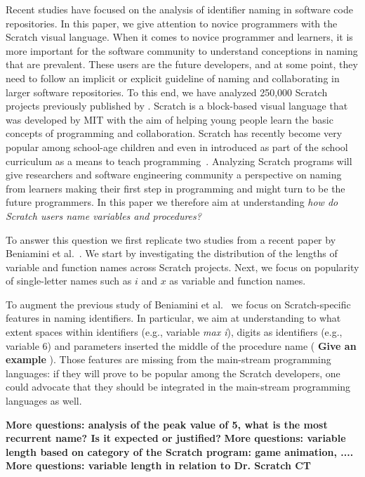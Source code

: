 \documentclass[conference]{IEEEtran}
\newcommand{\todo}[1]{ \textbf{#1} }
\begin{document}
Recent studies have focused on the analysis of identifier naming in software code repositories. 
In this paper, we give attention to novice programmers with the Scratch visual language. 
When it comes to novice programmer and learners, it is more important for the software community to understand conceptions in naming that are prevalent. 
These users are the future developers, and at some point, they need to follow an implicit or explicit guideline of naming and collaborating in larger software repositories. 
To this end, we have analyzed 250,000 Scratch projects previously published by \cite{Aivaloglou2016HowKC}.
Scratch is a block-based visual language that was developed by MIT with the aim of helping young people learn the basic concepts of programming and collaboration.
Scratch has recently become very popular among school-age children and even in introduced as part of the school curriculum as a means to teach programming~\cite{SaezLopez}.
Analyzing Scratch programs will give researchers and software engineering community a perspective on naming from learners making their first step in programming and might turn to be the future programmers. In this paper we therefore aim at understanding \emph{how do Scratch users name variables and procedures? }

To answer this question we first replicate two studies from a recent paper by Beniamini et al.~\cite{Beniamini}.
We start by investigating the distribution of the lengths of variable and function names across Scratch projects. 
Next, we focus on popularity of single-letter names such as $i$ and $x$ as variable and function names.

To augment the previous study of Beniamini et al.~\cite{Beniamini} we focus on Scratch-specific features in naming identifiers.
In particular, we aim at understanding to what extent spaces within identifiers (e.g., variable \emph{max i}), digits as identifiers (e.g., variable 6) and parameters inserted the middle of the procedure name (\todo{Give an example}).
Those features are missing from the main-stream programming languages: if they will prove to be popular among the Scratch developers, one could advocate that they should be integrated in the main-stream programming languages as well.

\todo{More questions: analysis of the peak value of 5, what is the most recurrent name? Is it expected or justified?}
\todo{More questions: variable length based on category of the Scratch program: game animation, ....}
\todo{More questions: variable length in relation to Dr. Scratch CT}
 
\end{document}
